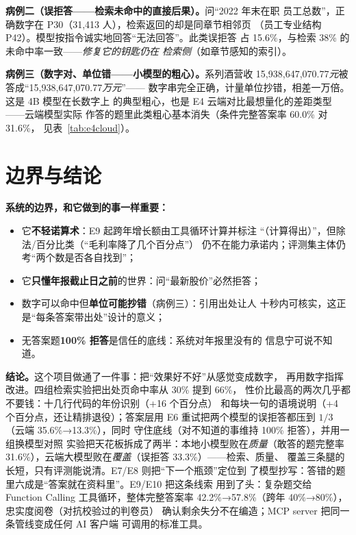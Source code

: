 \documentclass[UTF8,11pt]{ctexart}
\begin{document}
\textbf{病例二（误拒答——检索未命中的直接后果）。}问``2022 年末在职
员工总数''，正确数字在 P30（31,413 人），检索返回的却是同章节相邻页
（员工专业结构 P42）。模型按指令诚实地回答``无法回答''。此类误拒答
占 15.6\%，与检索 38\% 的未命中率一致——\emph{修复它的钥匙仍在
检索侧}（如章节感知的索引）。

{\sloppy
\textbf{病例三（数字对、单位错——小模型的粗心）。}系列酒营收
15,938,647,070.77\emph{元}被答成``15,938,647,070.77\emph{万元}''——
数字串完全正确，计量单位抄错，相差一万倍。这是 4B 模型在长数字上
的典型粗心，也是 E4 云端对比最想量化的差距类型——云端模型实际
作答的题里此类粗心基本消失（条件完整答案率 60.0\% 对 31.6\%，
见表~\ref{tab:e4cloud}）。\par}

\section{边界与结论}

\textbf{系统的边界，和它做到的事一样重要：}

\begin{itemize}
  \item 它\textbf{不轻诺算术}：E9 起跨年增长额由工具循环计算并标注
        ``（计算得出）''，但除法/百分比类（``毛利率降了几个百分点''）
        仍不在能力承诺内；评测集主体仍考``两个数是否各自找到''；
  \item 它\textbf{只懂年报截止日之前}的世界：问``最新股价''必然拒答；
  \item 数字可以命中但\textbf{单位可能抄错}（病例三）：引用出处让人
        十秒内可核实，这正是``每条答案带出处''设计的意义；
  \item 无答案题\textbf{100\% 拒答}是信任的底线：系统对年报里没有的
        信息宁可说不知道。
\end{itemize}

\textbf{结论。}这个项目做通了一件事：把``效果好不好''从感觉变成数字，
再用数字指挥改进。四组检索实验把出处页命中率从 30\% 提到 66\%，
性价比最高的两次几乎都不要钱：十几行代码的年份识别（+16 个百分点）
和每块一句的语境说明（+4 个百分点，还让精排退役）；答案层用
E6 重试把两个模型的误拒答都压到 $1/3$（云端 35.6\%→13.3\%），同时
守住底线（对不知道的事维持 100\% 拒答），并用一组换模型对照
实验把天花板拆成了两半：本地小模型败在\emph{质量}（敢答的题完整率
31.6\%），云端大模型败在\emph{覆盖}（误拒答 33.3\%）——检索、质量、
覆盖三条腿的长短，只有评测能说清。E7/E8 则把``下一个瓶颈''定位到
了模型抄写：答错的题里六成是``答案就在资料里''。E9/E10 把这条线索
用到了头：复杂题交给 Function Calling 工具循环，整体完整答案率
42.2\%→57.8\%（跨年 40\%→80\%），忠实度阅卷（对抗校验过的判卷员）
确认剩余失分不在编造；MCP server 把同一条管线变成任何 AI 客户端
可调用的标准工具。
\end{document}
